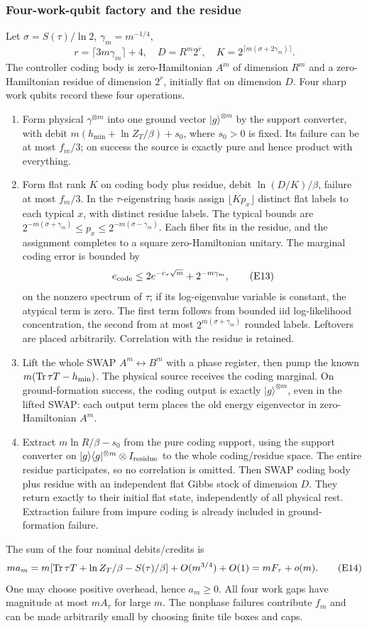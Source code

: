 \subsubsection{Four-work-qubit factory and the residue}
Let \(\sigma=S(\tau)/\ln2\), \(\gamma_m=m^{-1/4}\),
\[
 r=\lceil3m\gamma_m\rceil+4,\quad
 D=R^m2^r,\quad K=2^{\lceil m(\sigma+2\gamma_m)\rceil}.
\]
The controller coding body is zero-Hamiltonian \(A^m\) of dimension \(R^m\)
and a zero-Hamiltonian residue of dimension \(2^r\), initially flat on dimension
\(D\). Four sharp work qubits record these four operations.
\begin{enumerate}
\item Form physical \(\gamma^{\otimes m}\) into one ground vector
\(|g\rangle^{\otimes m}\) by the support converter, with debit
\(m(h_{\min}+\ln Z_T/\beta)+s_0\), where \(s_0>0\) is fixed.
Its failure can be at most \(f_m/3\); on success the source is exactly
pure and hence product with everything.
\item Form flat rank \(K\) on coding body plus residue, debit
\(\ln(D/K)/\beta\), failure at most \(f_m/3\).
In the \(\tau\)-eigenstring basis assign \(\lfloor Kp_x\rfloor\)
distinct flat labels to each typical \(x\), with distinct residue labels.
The typical bounds are
\(2^{-m(\sigma+\gamma_m)}\le p_x\le2^{-m(\sigma-\gamma_m)}\).
Each fiber fits in the residue, and the assignment completes to a
square zero-Hamiltonian unitary. The marginal coding error is bounded by
\[
 e_{\rm code}\le2e^{-c_\tau\sqrt m}+2^{-m\gamma_m},    \tag{E13}
\]
on the nonzero spectrum of \(\tau\); if its log-eigenvalue variable
is constant, the atypical term is zero. The first term follows from
bounded iid log-likelihood concentration, the second from at most
\(2^{m(\sigma+\gamma_m)}\) rounded labels. Leftovers are placed
arbitrarily. Correlation with the residue is retained.
\item Lift the whole SWAP \(A^m\leftrightarrow B^m\) with a phase
register, then pump the known
\(m(\operatorname{Tr}\tau T-h_{\min})\). The physical source receives the coding
marginal. On ground-formation success, the coding output is exactly
\(|g\rangle^{\otimes m}\), even in the lifted SWAP: each output term
places the old energy eigenvector in zero-Hamiltonian \(A^m\).
\item Extract \(m\ln R/\beta-s_0\) from the pure coding support,
using the support converter on
\(|g\rangle\langle g|^{\otimes m}\otimes I_{\rm residue}\)
to the whole coding/residue space. The entire residue participates,
so no correlation is omitted. Then SWAP coding body plus residue
with an independent flat Gibbs stock of dimension \(D\).
They return exactly to their initial flat state, independently of
all physical rest. Extraction failure from impure coding is already
included in ground-formation failure.
\end{enumerate}
The sum of the four nominal debits/credits is
\[
 ma_m=m[\operatorname{Tr}\tau T+\ln Z_T/\beta-S(\tau)/\beta]
       +O(m^{3/4})+O(1)=mF_\tau+o(m).               \tag{E14}
\]
One may choose positive overhead, hence \(a_m\ge0\).
All four work gaps have magnitude at most \(mA_\tau\) for large \(m\).
The nonphase failures contribute \(f_m\) and can be made arbitrarily
small by choosing finite tile boxes and caps.

